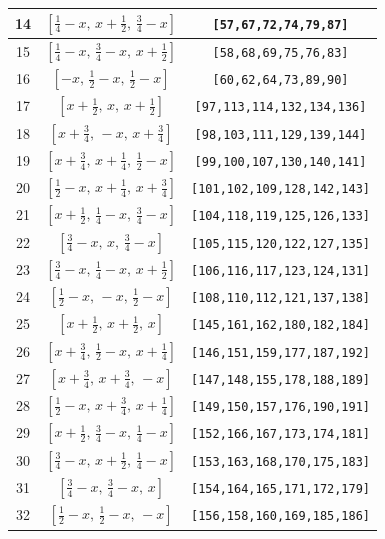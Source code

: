 \documentclass[fleqn,8pt]{jsarticle}
\begin{document}
\begin{longtable}{ccc}
14 & $\left[ \frac{1}{4} - x,\, x + \frac{1}{2},\, \frac{3}{4} - x \right]$ & {\tt [57,67,72,74,79,87]} \\ \hline
15 & $\left[ \frac{1}{4} - x,\, \frac{3}{4} - x,\, x + \frac{1}{2} \right]$ & {\tt [58,68,69,75,76,83]} \\ \hline
16 & $\left[ - x,\, \frac{1}{2} - x,\, \frac{1}{2} - x \right]$ & {\tt [60,62,64,73,89,90]} \\ \hline
17 & $\left[ x + \frac{1}{2},\, x,\, x + \frac{1}{2} \right]$ & {\tt [97,113,114,132,134,136]} \\ \hline
18 & $\left[ x + \frac{3}{4},\, - x,\, x + \frac{3}{4} \right]$ & {\tt [98,103,111,129,139,144]} \\ \hline
19 & $\left[ x + \frac{3}{4},\, x + \frac{1}{4},\, \frac{1}{2} - x \right]$ & {\tt [99,100,107,130,140,141]} \\ \hline
20 & $\left[ \frac{1}{2} - x,\, x + \frac{1}{4},\, x + \frac{3}{4} \right]$ & {\tt [101,102,109,128,142,143]} \\ \hline
21 & $\left[ x + \frac{1}{2},\, \frac{1}{4} - x,\, \frac{3}{4} - x \right]$ & {\tt [104,118,119,125,126,133]} \\ \hline
22 & $\left[ \frac{3}{4} - x,\, x,\, \frac{3}{4} - x \right]$ & {\tt [105,115,120,122,127,135]} \\ \hline
23 & $\left[ \frac{3}{4} - x,\, \frac{1}{4} - x,\, x + \frac{1}{2} \right]$ & {\tt [106,116,117,123,124,131]} \\ \hline
24 & $\left[ \frac{1}{2} - x,\, - x,\, \frac{1}{2} - x \right]$ & {\tt [108,110,112,121,137,138]} \\ \hline
25 & $\left[ x + \frac{1}{2},\, x + \frac{1}{2},\, x \right]$ & {\tt [145,161,162,180,182,184]} \\ \hline
26 & $\left[ x + \frac{3}{4},\, \frac{1}{2} - x,\, x + \frac{1}{4} \right]$ & {\tt [146,151,159,177,187,192]} \\ \hline
27 & $\left[ x + \frac{3}{4},\, x + \frac{3}{4},\, - x \right]$ & {\tt [147,148,155,178,188,189]} \\ \hline
28 & $\left[ \frac{1}{2} - x,\, x + \frac{3}{4},\, x + \frac{1}{4} \right]$ & {\tt [149,150,157,176,190,191]} \\ \hline
29 & $\left[ x + \frac{1}{2},\, \frac{3}{4} - x,\, \frac{1}{4} - x \right]$ & {\tt [152,166,167,173,174,181]} \\ \hline
30 & $\left[ \frac{3}{4} - x,\, x + \frac{1}{2},\, \frac{1}{4} - x \right]$ & {\tt [153,163,168,170,175,183]} \\ \hline
31 & $\left[ \frac{3}{4} - x,\, \frac{3}{4} - x,\, x \right]$ & {\tt [154,164,165,171,172,179]} \\ \hline
32 & $\left[ \frac{1}{2} - x,\, \frac{1}{2} - x,\, - x \right]$ & {\tt [156,158,160,169,185,186]} \\
\end{longtable}
\end{document}
